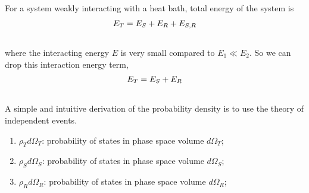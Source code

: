 \documentclass[letterpaper,10pt,english]{sphinxmanual}
\begin{document}
For a system weakly interacting with a heat bath, total energy of the system is
\begin{gather}
\begin{split}E_T = E_S + E_R + E _{S,R}\end{split}\notag\\\begin{split}\end{split}\notag
\end{gather}
where the interacting energy $E$ is very small compared to $E_1\ll E_2$. So we can drop this interaction energy term,
\begin{gather}
\begin{split}E_T = E_S + E _R\end{split}\notag\\\begin{split}\end{split}\notag
\end{gather}
A simple and intuitive derivation of the probability density is to use the theory of independent events.
\begin{enumerate}
\item {} 
$\rho_T d\Omega_T$: probability of states in phase space volume $d\Omega_T$;

\item {} 
$\rho_S d \Omega_S$: probability of states in phase space volume $d\Omega_S$;

\item {} 
$\rho_R d \Omega_R$: probability of states in phase space volume $d\Omega_R$;

\end{enumerate}
\end{document}
